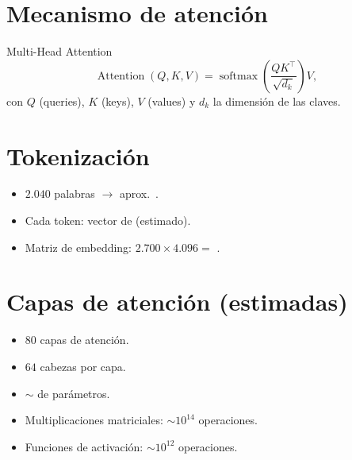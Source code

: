 \documentclass{claudeeditorial}
\begin{document}

\section{Mecanismo de atención}

\begin{ClaudeCard}{Multi-Head Attention}
\[
  \operatorname{Attention}(Q,K,V) = \operatorname{softmax}\!\left(\frac{Q K^\top}{\sqrt{d_k}}\right) V,
\]
con $Q$ (queries), $K$ (keys), $V$ (values) y $d_k$ la dimensión de las claves.
\end{ClaudeCard}

\section{Tokenización}

\begin{ClaudeTip}
\begin{itemize}[leftmargin=1.2em,nosep]
\item $2.040$ palabras $\to$ aprox.\ .
\item Cada token: vector de  (estimado).
\item Matriz de embedding: $2.700\times 4.096 =$ .
\end{itemize}
\end{ClaudeTip}

\section{Capas de atención (estimadas)}

\begin{ClaudeInfo}
\begin{itemize}[leftmargin=1.2em,nosep]
\item $80$ capas de atención.
\item $64$ cabezas por capa.
\item $\sim$ de parámetros.
\item Multiplicaciones matriciales: $\sim 10^{14}$ operaciones.
\item Funciones de activación: $\sim 10^{12}$ operaciones.
\end{itemize}
\end{ClaudeInfo}
\end{document}
